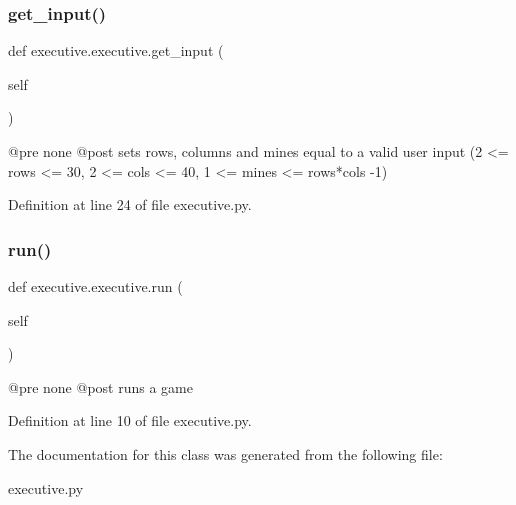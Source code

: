 \subsubsection{\texorpdfstring{get\+\_\+input()}{get\_input()}}
{\footnotesize\ttfamily def executive.\+executive.\+get\+\_\+input (\begin{DoxyParamCaption}\item[{}]{self }\end{DoxyParamCaption})}

\begin{DoxyVerb}@pre none
@post sets rows, columns and mines equal to a valid user input (2 <= rows <= 30, 2 <= cols <= 40, 1 <= mines <= rows*cols -1)
\end{DoxyVerb}
 

Definition at line 24 of file executive.\+py.

\mbox{\label{classexecutive_1_1executive_abe92cddf119081cac6c747858df061d7}} 
\subsubsection{\texorpdfstring{run()}{run()}}
{\footnotesize\ttfamily def executive.\+executive.\+run (\begin{DoxyParamCaption}\item[{}]{self }\end{DoxyParamCaption})}

\begin{DoxyVerb}@pre none
@post runs a game
\end{DoxyVerb}
 

Definition at line 10 of file executive.\+py.



The documentation for this class was generated from the following file\+:\begin{DoxyCompactItemize}
\item 
executive.\+py\end{DoxyCompactItemize}
